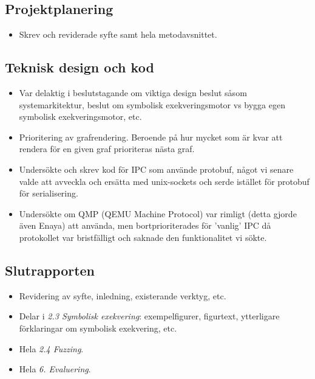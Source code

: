 \subsection*{Projektplanering}
\begin{itemize}
	\item Skrev och reviderade syfte samt hela metodavsnittet.
\end{itemize}

\subsection*{Teknisk design och kod}
\begin{itemize}
	\item Var delaktig i beslutstagande om viktiga design beslut såsom
	      systemarkitektur, beslut om symbolisk exekveringsmotor vs bygga egen
	      symbolisk exekveringsmotor, etc.

	\item Prioritering av grafrendering. Beroende på hur mycket som är kvar att
	      rendera för en given graf prioriteras nästa graf.

	\item Undersökte och skrev kod för IPC som använde protobuf, något vi senare
	      valde att avveckla och ersätta med unix-sockets och serde istället för
	      protobuf för serialisering.

	\item Undersökte om QMP (QEMU Machine Protocol) var rimligt (detta gjorde även Enaya) att använda,
	      men bortprioriterades för 'vanlig' IPC då protokollet var bristfälligt och
	      saknade den funktionalitet vi sökte.
\end{itemize}

\subsection*{Slutrapporten}
\begin{itemize}
	\item Revidering av syfte, inledning, existerande verktyg, etc.

	\item Delar i \textit{2.3 Symbolisk exekvering}: exempelfigurer, figurtext, ytterligare
	      förklaringar om symbolisk exekvering, etc.

	\item Hela \textit{2.4 Fuzzing}.

	\item Hela \textit{6. Evaluering}.
\end{itemize}

